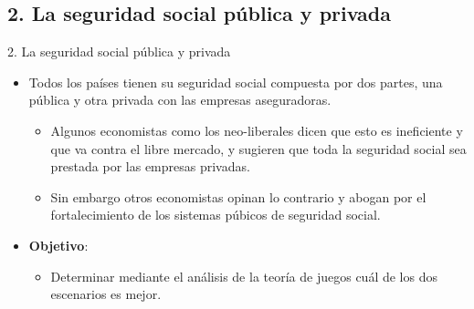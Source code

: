 \documentclass[10pt]{beamer}
\begin{document}
\subsection{2. La seguridad social pública y privada}
\begin{frame}{2. La seguridad social pública y privada}
	\begin{itemize}
	\item[2. 1.] Todos los países tienen su seguridad social compuesta por dos partes, una pública y otra privada con las empresas aseguradoras.
	\begin{itemize}
		\item[2. 1. a.] Algunos economistas como los neo-liberales dicen que esto es ineficiente y que va contra el libre mercado, y sugieren que toda la	seguridad social sea prestada por las empresas privadas.
		\item[2. 1. b.] Sin embargo otros economistas opinan lo contrario y abogan por el fortalecimiento de los sistemas púbicos de seguridad social.
	\end{itemize}
		\item[2. 2.] \textbf{Objetivo}:
		\begin{itemize}
			\item Determinar mediante el análisis de la teoría de juegos cuál de los dos escenarios es mejor.
		\end{itemize}
	\end{itemize}
\end{frame}


%	
\end{document}
